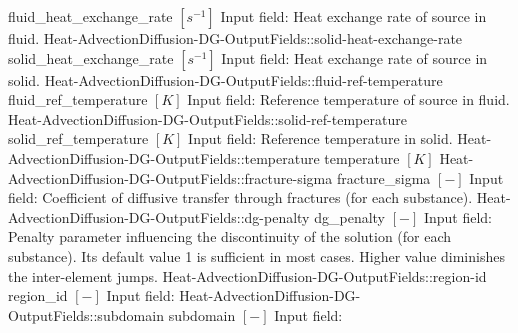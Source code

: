 \begin{SelectionType}
			{fluid{\_}heat{\_}exchange{\_}rate}
			{{{}{$[s^{-1}]$}{ Input field: Heat exchange rate of source in fluid.}%
}}
		\SelectionItem
			{Heat-AdvectionDiffusion-DG-OutputFields::solid-heat-exchange-rate}
			{solid{\_}heat{\_}exchange{\_}rate}
			{{{}{$[s^{-1}]$}{ Input field: Heat exchange rate of source in solid.}%
}}
		\SelectionItem
			{Heat-AdvectionDiffusion-DG-OutputFields::fluid-ref-temperature}
			{fluid{\_}ref{\_}temperature}
			{{{}{$[K]$}{ Input field: Reference temperature of source in fluid.}%
}}
		\SelectionItem
			{Heat-AdvectionDiffusion-DG-OutputFields::solid-ref-temperature}
			{solid{\_}ref{\_}temperature}
			{{{}{$[K]$}{ Input field: Reference temperature in solid.}%
}}
		\SelectionItem
			{Heat-AdvectionDiffusion-DG-OutputFields::temperature}
			{temperature}
			{{{}{$[K]$}{ }%
}}
		\SelectionItem
			{Heat-AdvectionDiffusion-DG-OutputFields::fracture-sigma}
			{fracture{\_}sigma}
			{{{}{$[-]$}{ Input field: Coefficient of diffusive transfer through fractures (for each substance).}%
}}
		\SelectionItem
			{Heat-AdvectionDiffusion-DG-OutputFields::dg-penalty}
			{dg{\_}penalty}
			{{{}{$[-]$}{ Input field: Penalty parameter influencing the discontinuity of the solution (for each substance). Its default value 1 is sufficient in most cases.
Higher value diminishes the inter-element jumps.}%
}}
		\SelectionItem
			{Heat-AdvectionDiffusion-DG-OutputFields::region-id}
			{region{\_}id}
			{{{}{$[-]$}{ Input field: }%
}}
		\SelectionItem
			{Heat-AdvectionDiffusion-DG-OutputFields::subdomain}
			{subdomain}
			{{{}{$[-]$}{ Input field: }%
}}
\end{SelectionType}
